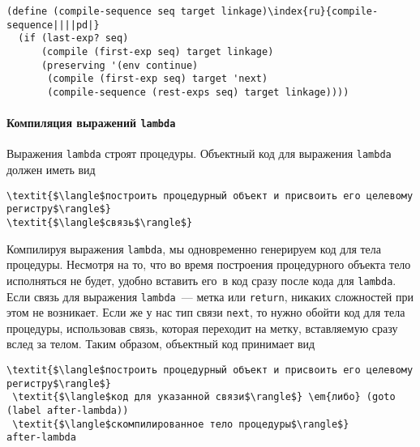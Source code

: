 \begin{Verbatim}[fontsize=\small]
(define (compile-sequence seq target linkage)\index{ru}{compile-sequence||||pd|}
  (if (last-exp? seq)
      (compile (first-exp seq) target linkage)
      (preserving '(env continue)
       (compile (first-exp seq) target 'next)
       (compile-sequence (rest-exps seq) target linkage))))
\end{Verbatim}

\paragraph{Компиляция выражений {\tt lambda}}


Выражения {\tt lambda} строят процедуры.
Объектный код для выражения {\tt lambda} должен иметь вид

\begin{Verbatim}[fontsize=\small]
\textit{$\langle$построить процедурный объект и присвоить его целевому регистру$\rangle$}
\textit{$\langle$связь$\rangle$}
\end{Verbatim}
Компилируя выражения {\tt lambda}, мы одновременно
генерируем код для тела процедуры.  Несмотря на то, что во время
построения процедурного объекта тело исполняться не будет, удобно
вставить его~в код сразу после кода для {\tt lambda}.  Если
связь для выражения {\tt lambda}~--- метка или
{\tt return}, никаких сложностей при этом не возникает.  Если
же у нас тип связи {\tt next}, то нужно обойти код для тела
процедуры, использовав связь, которая переходит на метку, вставляемую
сразу вслед за телом.  Таким образом, объектный код принимает вид

\begin{Verbatim}[fontsize=\small]
 \textit{$\langle$построить процедурный объект и присвоить его целевому регистру$\rangle$}
 \textit{$\langle$код для указанной связи$\rangle$} \em{либо} (goto (label after-lambda))
 \textit{$\langle$скомпилированное тело процедуры$\rangle$}
after-lambda
\end{Verbatim}


